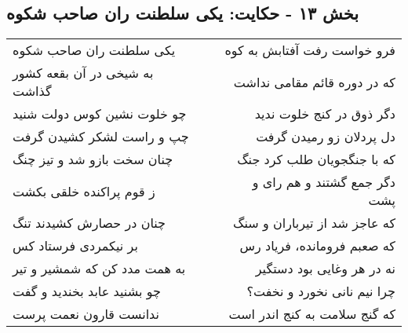 \begin{center}
\section*{بخش ۱۳ - حکایت: یکی سلطنت ران صاحب شکوه}
\label{sec:013}
\begin{longtable}{l p{0.5cm} r}
یکی سلطنت ران صاحب شکوه
&&
فرو خواست رفت آفتابش به کوه
\\
به شیخی در آن بقعه کشور گذاشت
&&
که در دوره قائم مقامی نداشت
\\
چو خلوت نشین کوس دولت شنید
&&
دگر ذوق در کنج خلوت ندید
\\
چپ و راست لشکر کشیدن گرفت
&&
دل پردلان زو رمیدن گرفت
\\
چنان سخت بازو شد و تیز چنگ
&&
که با جنگجویان طلب کرد جنگ
\\
ز قوم پراکنده خلقی بکشت
&&
دگر جمع گشتند و هم رای و پشت
\\
چنان در حصارش کشیدند تنگ
&&
که عاجز شد از تیرباران و سنگ
\\
بر نیکمردی فرستاد کس
&&
که صعبم فرومانده، فریاد رس
\\
به همت مدد کن که شمشیر و تیر
&&
نه در هر وغایی بود دستگیر
\\
چو بشنید عابد بخندید و گفت
&&
چرا نیم نانی نخورد و نخفت؟
\\
ندانست قارون نعمت پرست
&&
که گنج سلامت به کنج اندر است
\\
\end{longtable}
\end{center}
